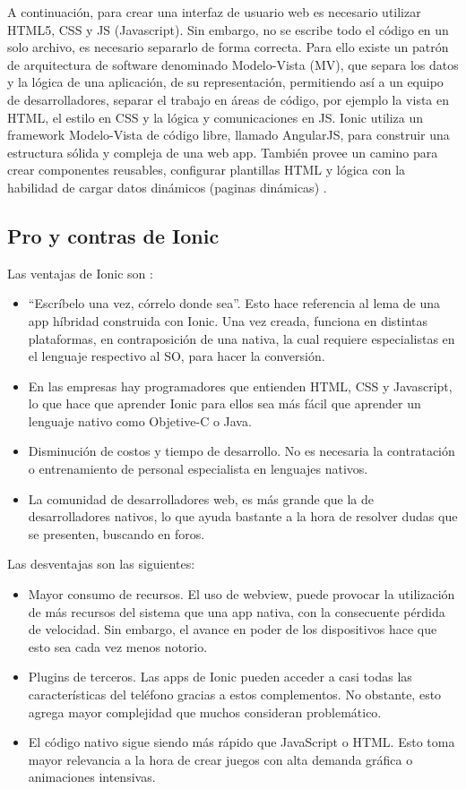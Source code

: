 A continuación, para crear una interfaz de usuario web es necesario utilizar HTML5, CSS y JS (Javascript). Sin embargo, no se escribe todo el código en un solo archivo, es necesario separarlo de forma correcta. Para ello existe un patrón de arquitectura de software denominado Modelo-Vista (MV), que separa los datos y la lógica de una aplicación, de su representación, permitiendo así a un equipo de desarrolladores, separar el trabajo en áreas de código, por ejemplo la vista en HTML, el estilo en CSS y la lógica y comunicaciones en JS.  Ionic utiliza un framework Modelo-Vista de código libre, llamado AngularJS, para construir una estructura sólida y compleja de una web app. También provee un camino para crear componentes reusables, configurar plantillas HTML y lógica con la habilidad de cargar datos dinámicos (paginas dinámicas) \citep*{Khanna:2017:IHM:3161211}.


\subsection{Pro y contras de Ionic }

Las ventajas de Ionic son \citep{IonicEbook}:
\begin{itemize}
    \item “Escríbelo una vez, córrelo donde sea”. Esto hace referencia al lema de una app híbridad construida con Ionic. Una vez creada, funciona en distintas plataformas, en contraposición de una nativa, la cual requiere especialistas en el lenguaje respectivo al SO, para hacer la conversión.
    \item 	En las empresas hay programadores que entienden HTML, CSS y Javascript, lo que hace que aprender Ionic para ellos sea más fácil que aprender un lenguaje nativo como Objetive-C o Java.
    \item Disminución de costos y tiempo de desarrollo. No es necesaria la contratación o entrenamiento de personal especialista en lenguajes nativos.
    \item La comunidad de desarrolladores web, es más grande que la de desarrolladores nativos, lo que ayuda bastante a la hora de resolver dudas que se presenten, buscando en foros.
\end{itemize}
Las desventajas son las siguientes:
\begin{itemize}
    \item Mayor consumo de recursos. El uso de webview, puede provocar la utilización de más recursos del sistema que una app nativa, con la consecuente pérdida de velocidad. Sin embargo, el avance en poder de los dispositivos hace que esto sea cada vez menos notorio.
    \item Plugins de terceros. Las apps de Ionic pueden acceder a casi todas las características del teléfono gracias a estos complementos. No obstante, esto agrega mayor complejidad que muchos consideran problemático.
    \item 	El código nativo sigue siendo más rápido que JavaScript o HTML. Esto toma mayor relevancia a la hora de crear juegos con alta demanda gráfica o animaciones intensivas.
\end{itemize}


